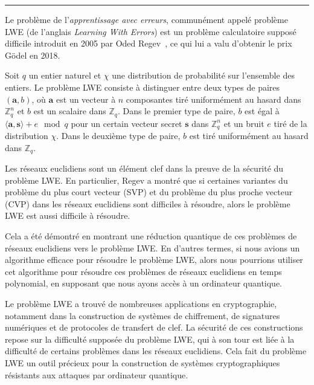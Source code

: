 \vskip1cm
\hrule
\vskip1cm

Le problème de l’\emph{apprentissage avec erreurs}, communément appelé problème LWE (de l’anglais \emph{Learning With Errors}) est un problème calculatoire supposé difficile introduit en 2005 par Oded Regev~\cite{STOC:Regev05}, ce qui lui a valu d’obtenir le prix Gödel en 2018.




Soit $q$ un entier naturel et $\chi$ une distribution de probabilité sur l'ensemble des entiers. Le problème LWE consiste à distinguer entre deux types de paires $(\mathbf{a}, b)$, où $\mathbf{a}$ est un vecteur à $n$ composantes tiré uniformément au hasard dans $\mathbb{Z}_q^n$ et $b$ est un scalaire dans $\mathbb{Z}_q$. Dans le premier type de paire, $b$ est égal à $\langle\mathbf{a},\mathbf{s}\rangle + e \mod q$ pour un certain vecteur secret $\mathbf{s}$ dans $\mathbb{Z}_q^n$ et un bruit $e$ tiré de la distribution $\chi$. Dans le deuxième type de paire, $b$ est tiré uniformément au hasard dans $\mathbb{Z}_q$.


Les réseaux euclidiens sont un élément clef dans la preuve de la sécurité du problème LWE. En particulier, Regev a montré que si certaines variantes du problème du plus court vecteur (SVP) et du problème du plus proche vecteur (CVP) dans les réseaux euclidiens sont difficiles à résoudre, alors le problème LWE est aussi difficile à résoudre.

Cela a été démontré en montrant une réduction quantique de ces problèmes de réseaux euclidiens vers le problème LWE. En d'autres termes, si nous avions un algorithme efficace pour résoudre le problème LWE, alors nous pourrions utiliser cet algorithme pour résoudre ces problèmes de réseaux euclidiens en temps polynomial, en supposant que nous ayons accès à un ordinateur quantique.


Le problème LWE a trouvé de nombreuses applications en cryptographie, notamment dans la construction de systèmes de chiffrement, de signatures numériques et de protocoles de transfert de clef. La sécurité de ces constructions repose sur la difficulté supposée du problème LWE, qui à son tour est liée à la difficulté de certains problèmes dans les réseaux euclidiens. Cela fait du problème LWE un outil précieux pour la construction de systèmes cryptographiques résistants aux attaques par ordinateur quantique.

